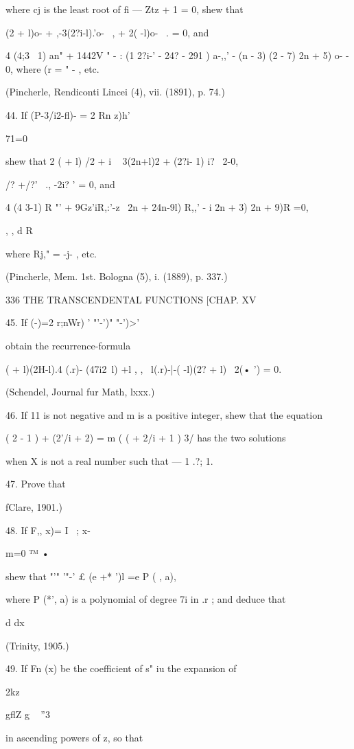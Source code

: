 {{{{where cj is the least root of fi — Ztz + 1 = 0, shew that

(2 + l)o- + ,-3(2?i-l).'o- \ , + 2( -l)o- \ . = 0, and

4 (4;3 \ 1) an" + 1442V " - : (1 2?i-' - 24? - 291 ) a-,,' - (n - 3)
(2 - 7) 2n + 5) o- - 0, where (r = " - , etc.

(Pincherle, Rendiconti Lincei (4), vii. (1891), p. 74.)

44. If (P-3/i2-fl)- = 2 Rn z)h'\

71=0

shew that 2 ( + l) /2 + i ~ 3(2n+l)2 + (2?i- 1) i? \ 2-0,

 /? +/?' \ ., -2i? ' = 0, and

4 (4 3-1) R "' + 9Gz'iR,:'-z \ 2n + 24n-9l) R,,' - i 2n + 3) 2n + 9)R
=0,

, , d R

where Rj," = -j- , etc.

(Pincherle, Mem. 1st. Bologna (5), i. (1889), p. 337.)

336 THE TRANSCENDENTAL FUNCTIONS [CHAP. XV

45. If (-)=2 r;nWr) ' "'-')" "-')>'

obtain the recurrence-formula

( + l)(2H-l).4 (.r)- (47i2\ l) +l , , \ l(.r)-|-( -l)(2? + l) \ 2(• ')
= 0.

(Schendel, Journal fur Math, lxxx.)

46. If 11 is not negative and m is a positive integer, shew that the
equation

( 2 - 1 ) + (2'/i + 2) = m ( ( + 2/i + 1 ) 3/ has the two solutions

when X is not a real number such that — 1 .?; 1.

47. Prove that

fClare, 1901.)

48. If F,, x)= I ~; x-\

m=0 ™ •

shew that "'" '"-' £ (e +* ')l =e P ( , a),

where P (*', a) is a polynomial of degree 7i in .r ; and deduce that

d dx

(Trinity, 1905.)

49. If Fn (x) be the coefficient of s" iu the expansion of

2kz

gflZ g ~ ''3

in ascending powers of z, so that

}}}}
